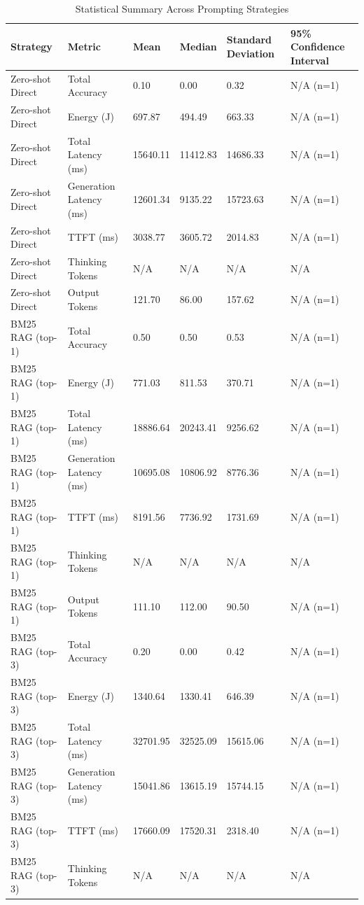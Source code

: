 \begin{table}
\caption{Statistical Summary Across Prompting Strategies}
\label{tab:statistical_summary}
\begin{tabular}{llllll}
\toprule
Strategy & Metric & Mean & Median & Standard Deviation & 95\% Confidence Interval \\
\midrule
Zero-shot Direct & Total Accuracy & 0.10 & 0.00 & 0.32 & N/A (n=1) \\
Zero-shot Direct & Energy (J) & 697.87 & 494.49 & 663.33 & N/A (n=1) \\
Zero-shot Direct & Total Latency (ms) & 15640.11 & 11412.83 & 14686.33 & N/A (n=1) \\
Zero-shot Direct & Generation Latency (ms) & 12601.34 & 9135.22 & 15723.63 & N/A (n=1) \\
Zero-shot Direct & TTFT (ms) & 3038.77 & 3605.72 & 2014.83 & N/A (n=1) \\
Zero-shot Direct & Thinking Tokens & N/A & N/A & N/A & N/A \\
Zero-shot Direct & Output Tokens & 121.70 & 86.00 & 157.62 & N/A (n=1) \\
BM25 RAG (top-1) & Total Accuracy & 0.50 & 0.50 & 0.53 & N/A (n=1) \\
BM25 RAG (top-1) & Energy (J) & 771.03 & 811.53 & 370.71 & N/A (n=1) \\
BM25 RAG (top-1) & Total Latency (ms) & 18886.64 & 20243.41 & 9256.62 & N/A (n=1) \\
BM25 RAG (top-1) & Generation Latency (ms) & 10695.08 & 10806.92 & 8776.36 & N/A (n=1) \\
BM25 RAG (top-1) & TTFT (ms) & 8191.56 & 7736.92 & 1731.69 & N/A (n=1) \\
BM25 RAG (top-1) & Thinking Tokens & N/A & N/A & N/A & N/A \\
BM25 RAG (top-1) & Output Tokens & 111.10 & 112.00 & 90.50 & N/A (n=1) \\
BM25 RAG (top-3) & Total Accuracy & 0.20 & 0.00 & 0.42 & N/A (n=1) \\
BM25 RAG (top-3) & Energy (J) & 1340.64 & 1330.41 & 646.39 & N/A (n=1) \\
BM25 RAG (top-3) & Total Latency (ms) & 32701.95 & 32525.09 & 15615.06 & N/A (n=1) \\
BM25 RAG (top-3) & Generation Latency (ms) & 15041.86 & 13615.19 & 15744.15 & N/A (n=1) \\
BM25 RAG (top-3) & TTFT (ms) & 17660.09 & 17520.31 & 2318.40 & N/A (n=1) \\
BM25 RAG (top-3) & Thinking Tokens & N/A & N/A & N/A & N/A \\

\end{tabular}
\end{table}
